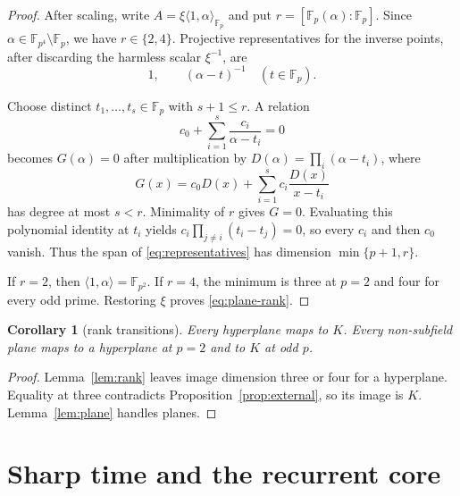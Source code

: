 \documentclass[a4paper,10pt]{amsart}
\newtheorem{corollary}[theorem]{Corollary}
\theoremstyle{remark}
\newcommand{\F}{\mathbb F}
\newcommand{\K}{K}
\begin{document}
\begin{proof}
After scaling, write $A=\xi\langle1,\alpha\rangle_{\F_p}$ and put
$r=[\F_p(\alpha):\F_p]$.  Since $\alpha\in\F_{p^4}\setminus\F_p$, we have
$r\in\{2,4\}$.  Projective representatives for the inverse points, after
discarding the harmless scalar $\xi^{-1}$, are
\begin{equation}\label{eq:representatives}
 1,\qquad(\alpha-t)^{-1}\quad(t\in\F_p).
\end{equation}

Choose distinct $t_1,\ldots,t_s\in\F_p$ with $s+1\leq r$.  A relation
\[
 c_0+\sum_{i=1}^{s}\frac{c_i}{\alpha-t_i}=0
\]
becomes $G(\alpha)=0$ after multiplication by
$D(\alpha)=\prod_i(\alpha-t_i)$, where
\[
 G(x)=c_0D(x)+\sum_{i=1}^{s}c_i\frac{D(x)}{x-t_i}
\]
has degree at most $s<r$.  Minimality of $r$ gives $G=0$.  Evaluating this
polynomial identity at $t_i$ yields
$c_i\prod_{j\ne i}(t_i-t_j)=0$, so every $c_i$ and then $c_0$ vanish.
Thus the span of \eqref{eq:representatives} has dimension
$\min\{p+1,r\}$.

If $r=2$, then $\langle1,\alpha\rangle=\F_{p^2}$.  If $r=4$, the minimum is
three at $p=2$ and four for every odd prime.  Restoring $\xi$ proves
\eqref{eq:plane-rank}.
\end{proof}

\begin{corollary}[rank transitions]\label{cor:transitions}
Every hyperplane maps to $\K$.  Every non-subfield plane maps to a
hyperplane at $p=2$ and to $\K$ at odd $p$.
\end{corollary}

\begin{proof}
Lemma~\ref{lem:rank} leaves image dimension three or four for a hyperplane.
Equality at three contradicts Proposition~\ref{prop:external}, so its image
is $\K$.  Lemma~\ref{lem:plane} handles planes.
\end{proof}

\section{Sharp time and the recurrent core}
\end{document}
